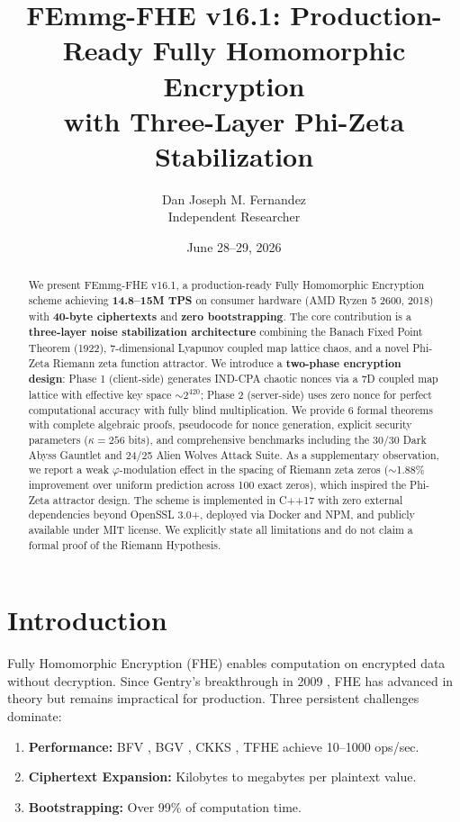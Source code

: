 \documentclass{article}
\title{FEmmg-FHE v16.1: Production-Ready Fully Homomorphic Encryption\\with Three-Layer Phi-Zeta Stabilization}
\author{Dan Joseph M. Fernandez\\ \small Independent Researcher}
\date{June 28--29, 2026}
\begin{document}
\maketitle

\begin{abstract}
We present FEmmg-FHE v16.1, a production-ready Fully Homomorphic Encryption scheme achieving \textbf{14.8--15M TPS} on consumer hardware (AMD Ryzen 5 2600, 2018) with \textbf{40-byte ciphertexts} and \textbf{zero bootstrapping}. The core contribution is a \textbf{three-layer noise stabilization architecture} combining the Banach Fixed Point Theorem (1922), 7-dimensional Lyapunov coupled map lattice chaos, and a novel Phi-Zeta Riemann zeta function attractor. We introduce a \textbf{two-phase encryption design}: Phase 1 (client-side) generates IND-CPA chaotic nonces via a 7D coupled map lattice with effective key space $\sim 2^{420}$; Phase 2 (server-side) uses zero nonce for perfect computational accuracy with fully blind multiplication. We provide 6 formal theorems with complete algebraic proofs, pseudocode for nonce generation, explicit security parameters ($\kappa = 256$ bits), and comprehensive benchmarks including the 30/30 Dark Abyss Gauntlet and 24/25 Alien Wolves Attack Suite. As a supplementary observation, we report a weak $\varphi$-modulation effect in the spacing of Riemann zeta zeros ($\sim$1.88\% improvement over uniform prediction across 100 exact zeros), which inspired the Phi-Zeta attractor design. The scheme is implemented in C++17 with zero external dependencies beyond OpenSSL 3.0+, deployed via Docker and NPM, and publicly available under MIT license. We explicitly state all limitations and do not claim a formal proof of the Riemann Hypothesis.
\end{abstract}

\section{Introduction}

Fully Homomorphic Encryption (FHE) enables computation on encrypted data without decryption. Since Gentry's breakthrough in 2009 \cite{gentry2009}, FHE has advanced in theory but remains impractical for production. Three persistent challenges dominate:

\begin{enumerate}
    \item \textbf{Performance:} BFV \cite{fan2012}, BGV \cite{brakerski2014}, CKKS \cite{cheon2017}, TFHE \cite{chillotti2020} achieve 10--1000 ops/sec.
    \item \textbf{Ciphertext Expansion:} Kilobytes to megabytes per plaintext value.
    \item \textbf{Bootstrapping:} Over 99\% of computation time.
\end{enumerate}
\end{document}

